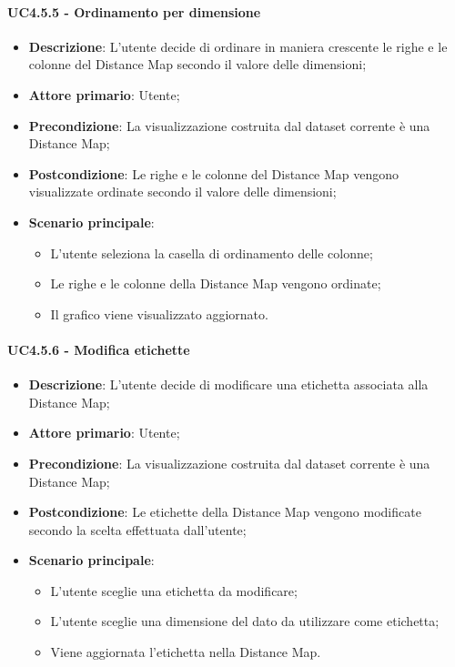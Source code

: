 \paragraph{UC4.5.5 - Ordinamento per dimensione}
\label{par:uc4.5.5}
\begin{itemize}
    \item \textbf{Descrizione}: L'utente decide di ordinare in maniera crescente le righe e le colonne del Distance Map secondo il valore delle dimensioni;
    \item \textbf{Attore primario}: Utente;
    \item \textbf{Precondizione}: La visualizzazione costruita dal dataset corrente è una Distance Map;
    \item \textbf{Postcondizione}: Le righe e le colonne del Distance Map vengono visualizzate ordinate secondo il valore delle dimensioni;
    \item \textbf{Scenario principale}:
    \begin{itemize}
        \item L'utente seleziona la casella di ordinamento delle colonne;
        \item Le righe e le colonne della Distance Map vengono ordinate;
        \item Il grafico viene visualizzato aggiornato.
    \end{itemize}
\end{itemize}


\paragraph{UC4.5.6 - Modifica etichette}
\label{par:uc4.5.6}
\begin{itemize}
    \item \textbf{Descrizione}: L'utente decide di modificare una etichetta associata alla Distance Map;
    \item \textbf{Attore primario}: Utente;
    \item \textbf{Precondizione}: La visualizzazione costruita dal dataset corrente è una Distance Map;
    \item \textbf{Postcondizione}: Le etichette della Distance Map vengono modificate secondo la scelta effettuata dall'utente;
    \item \textbf{Scenario principale}:
    \begin{itemize}
        \item L'utente sceglie una etichetta da modificare;
        \item L'utente sceglie una dimensione del dato da utilizzare come etichetta;
        \item Viene aggiornata l'etichetta nella Distance Map.
    \end{itemize}
\end{itemize}


